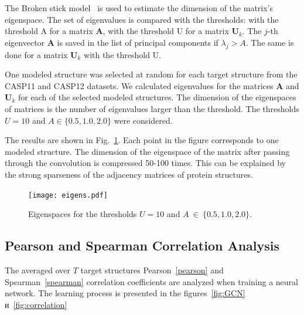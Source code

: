 \documentclass[12pt,twosides]{extarticle}
\begin{document}
The Broken stick model~\cite{Component_retention} is used to estimate the dimension of the matrix's eigenspace. The set of eigenvalues is compared with the thresholds: with the threshold A for a matrix $\textbf{A}$, with the threshold U for a matrix $\textbf{U}_k$. The $j$-th eigenvector $\textbf{A}$ is saved in the list of principal components if $\lambda_j>A$. The same is done for a matrix $\textbf{U}_k$ with the threshold U.

One modeled structure was selected at random for each target structure from the CASP11 and CASP12 datasets. 
We calculated eigenvalues for the matrices $\textbf{A}$ and $\textbf{U}_k $ for each of the selected modeled structures. The dimension of the eigenspaces of matrices is the number of eigenvalues larger than the threshold. The thresholds $U = 10$ and $A \in \{0.5, 1.0, 2.0 \} $ were considered.

The results are shown in Fig.~\ref{eigens_dims}. Each point in the figure corresponds to one modeled structure. The dimension of the eigenspace of the matrix after passing through the convolution is compressed 50-100 times. This can be explained by the strong sparseness of the adjacency matrices of protein structures.

\begin{figure}[H]
	\centering
	\texttt{[image: eigens.pdf]}
	\caption{Eigenspaces for the thresholds $U=10$ and $A~\in~\{0.5, 1.0, 2.0\}$.}
	\label{eigens_dims}
\end{figure}


\subsection{Pearson and Spearman Correlation Analysis}
The averaged over $T$ target structures Pearson~\eqref{pearson} and Spearman~\eqref{spearman}  correlation coefficients are analyzed when training a neural network. The learning process is presented in the figures~\ref{fig:GCN} и~\ref{fig:correlation}
\end{document}
